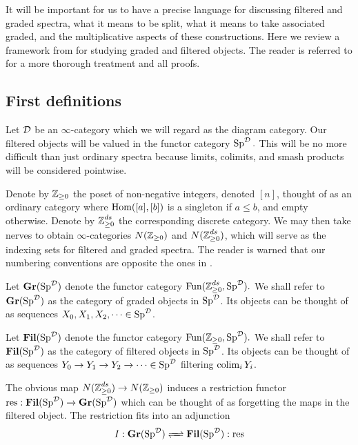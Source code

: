 
It will be important for us to have a precise language for discussing filtered and graded spectra, what it means to be split, what it means to take associated graded, and the multiplicative aspects of these constructions. Here we review a framework from \cite{LurieRot} for studying graded and filtered objects.  The reader is referred to \cite{LurieRot} for a more thorough treatment and all proofs.  

\subsection{First definitions}
Let $\operatorname{\mathcal{D}}$ be an $\infty$-category which we will regard as the diagram category.  Our filtered objects will be valued in the functor category $\operatorname{\text{Sp}}^{\operatorname{\mathcal{D}}}.$  This will be no more difficult than just ordinary spectra because limits, colimits, and smash products will be considered pointwise.  

Denote by $\operatorname{\mathbb{Z}}_{\geq 0}$ the poset of non-negative integers, denoted $[n]$, thought of as an ordinary category where $\operatorname{\text{Hom}}([a],[b])$ is a singleton if $a\leq b$, and empty otherwise.  Denote by $\operatorname{\mathbb{Z}}_{\geq 0}^{ds}$ the corresponding discrete category.  We may then take nerves to obtain $\infty$-categories $N(\operatorname{\mathbb{Z}}_{\geq 0})$ and $N(\operatorname{\mathbb{Z}}_{\geq 0}^{ds})$, which will serve as the indexing sets for filtered and graded spectra.  The reader is warned that our numbering conventions are opposite the ones in \cite{LurieRot}.

\begin{dfn} 
Let $\operatorname{\textbf{Gr}}(\operatorname{\text{Sp}}^{\operatorname{\mathcal{D}}})$ denote the functor category $\operatorname{\text{Fun}}(\operatorname{\mathbb{Z}}_{\geq 0}^{ds}, \operatorname{\text{Sp}}^{\operatorname{\mathcal{D}}}).$  We shall refer to $\operatorname{\textbf{Gr}}(\operatorname{\text{Sp}}^{\operatorname{\mathcal{D}}})$ as the category of graded objects in $\operatorname{\text{Sp}}^{\operatorname{\mathcal{D}}}$.  Its objects can be thought of as sequences $X_0, X_1,X_2,\cdots \in \operatorname{\text{Sp}}^{\operatorname{\mathcal{D}}}$.
\end{dfn}

\begin{dfn} 
Let $\operatorname{\textbf{Fil}}(\operatorname{\text{Sp}}^{\operatorname{\mathcal{D}}})$ denote the functor category $\operatorname{\text{Fun}}(\operatorname{\mathbb{Z}}_{\geq 0}, \operatorname{\text{Sp}}^{\operatorname{\mathcal{D}}}).$  We shall refer to $\operatorname{\textbf{Fil}}(\operatorname{\text{Sp}}^{\operatorname{\mathcal{D}}})$ as the category of filtered objects in $\operatorname{\text{Sp}}^{\operatorname{\mathcal{D}}}$.  Its objects can be thought of as sequences $Y_0\to Y_1\to Y_2 \to \cdots \in \operatorname{\text{Sp}}^{\operatorname{\mathcal{D}}}$ filtering $\operatorname*{\text{colim}}_i Y_i$.  
\end{dfn}


The obvious map $N(\operatorname{\mathbb{Z}}_{\geq 0}^{ds}) \to N(\operatorname{\mathbb{Z}}_{\geq 0})$ induces a restriction functor $\text{res}: \operatorname{\textbf{Fil}}(\operatorname{\text{Sp}}^{\operatorname{\mathcal{D}}}) \to \operatorname{\textbf{Gr}}(\operatorname{\text{Sp}}^{\operatorname{\mathcal{D}}})$ which can be thought of as forgetting the maps in the filtered object.  The restriction fits into an adjunction  
$$I:\Gr(\Sp^{\D}) \xrightleftharpoons{\quad} \Fil(\Sp^{\D}) : \text{res}$$

